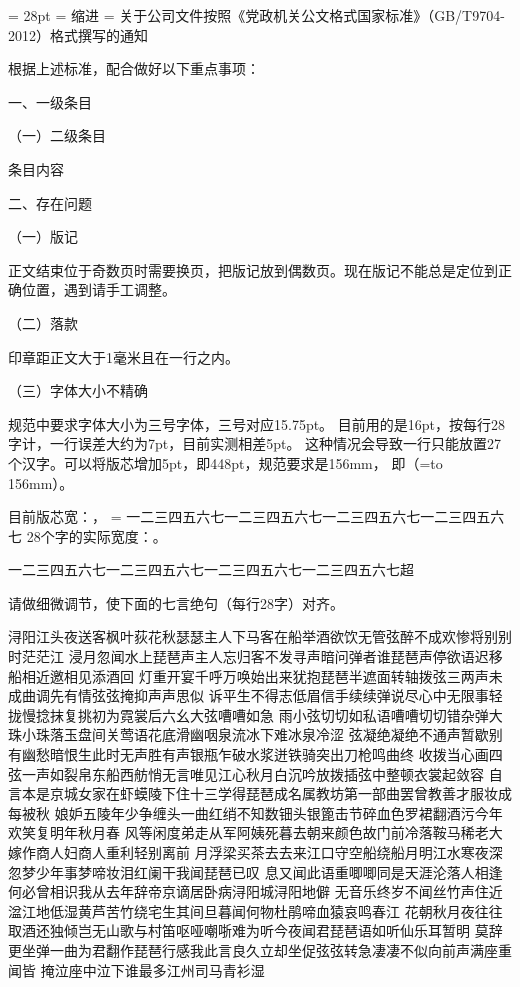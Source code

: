 {
\fangsong
\baselineskip = 28pt
 = \hbox{缩进}
\parindent = 
关于公司文件按照《党政机关公文格式国家标准》（GB/T9704-2012）格式撰写的通知\par
根据上述标准，配合做好以下重点事项：\par

{\heiti 一、一级条目}\par
{\kaiti （一）二级条目}\par
条目内容\par

{\heiti 二、存在问题}\par
{\kaiti （一）版记}\par
正文结束位于奇数页时需要换页，把版记放到偶数页。现在版记不能总是定位到正确位置，遇到请手工调整。\par
{\kaiti （二）落款}\par
印章距正文大于1毫米且在一行之内。\par

{\kaiti （三）字体大小不精确}\par
规范中要求字体大小为三号字体，三号对应15.75pt。
目前用的是16pt，按每行28字计，一行误差大约为7pt，目前实测相差5pt。
这种情况会导致一行只能放置27个汉字。可以将版芯增加5pt，即448pt，规范要求是156mm，
即（=\hbox to 156mm{}\the{}）。

目前版芯宽：\the\hsize，
 = \hbox{一二三四五六七一二三四五六七一二三四五六七一二三四五六七}
28个字的实际宽度：\the{}。\par
\noindent{}\par
\noindent{}一二三四五六七一二三四五六七一二三四五六七一二三四五六七超\par
请做细微调节，使下面的七言绝句（每行28字）对齐。\par
\noindent%
浔阳江头夜送客枫叶荻花秋瑟瑟主人下马客在船举酒欲饮无管弦醉不成欢惨将别别时茫茫江%
浸月忽闻水上琵琶声主人忘归客不发寻声暗问弹者谁琵琶声停欲语迟移船相近邀相见添酒回%
灯重开宴千呼万唤始出来犹抱琵琶半遮面转轴拨弦三两声未成曲调先有情弦弦掩抑声声思似%
诉平生不得志低眉信手续续弹说尽心中无限事轻拢慢捻抹复挑初为霓裳后六幺大弦嘈嘈如急%
雨小弦切切如私语嘈嘈切切错杂弹大珠小珠落玉盘间关莺语花底滑幽咽泉流冰下难冰泉冷涩%
弦凝绝凝绝不通声暂歇别有幽愁暗恨生此时无声胜有声银瓶乍破水浆迸铁骑突出刀枪鸣曲终%
收拨当心画四弦一声如裂帛东船西舫悄无言唯见江心秋月白沉吟放拨插弦中整顿衣裳起敛容%
自言本是京城女家在虾蟆陵下住十三学得琵琶成名属教坊第一部曲罢曾教善才服妆成每被秋%
娘妒五陵年少争缠头一曲红绡不知数钿头银篦击节碎血色罗裙翻酒污今年欢笑复明年秋月春%
风等闲度弟走从军阿姨死暮去朝来颜色故门前冷落鞍马稀老大嫁作商人妇商人重利轻别离前%
月浮梁买茶去去来江口守空船绕船月明江水寒夜深忽梦少年事梦啼妆泪红阑干我闻琵琶已叹%
息又闻此语重唧唧同是天涯沦落人相逢何必曾相识我从去年辞帝京谪居卧病浔阳城浔阳地僻%
无音乐终岁不闻丝竹声住近湓江地低湿黄芦苦竹绕宅生其间旦暮闻何物杜鹃啼血猿哀鸣春江%
花朝秋月夜往往取酒还独倾岂无山歌与村笛呕哑嘲哳难为听今夜闻君琵琶语如听仙乐耳暂明%
莫辞更坐弹一曲为君翻作琵琶行感我此言良久立却坐促弦弦转急凄凄不似向前声满座重闻皆%
掩泣座中泣下谁最多江州司马青衫湿

}

